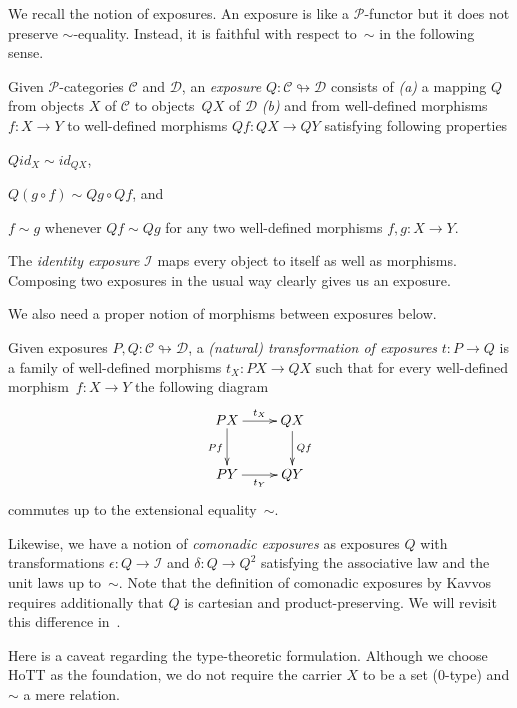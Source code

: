 \documentclass[a4paper,UKenglish,numberwithinsect,cleveref,thm-restate]{lipics-v2021}
\numberwithin{equation}{section}
\newcommand{\PP}{\mathscr{P}}
\newcommand{\iid}{\mathit{id}}
\theoremstyle{plain}
\begin{document}
We recall the notion of exposures.
An exposure is like a $\PP$-functor but it does not preserve $\sim$-equality.
Instead, it is faithful with respect to~$\sim$ in the following sense.
\begin{definition}
  Given $\PP$-categories $\mathscr{C}$ and $\mathscr{D}$, an \emph{exposure} $Q\colon \mathscr{C} \looparrowright \mathscr{D}$ consists of \emph{(a)} a mapping $Q$ from objects $X$ of $\mathscr{C}$ to objects~$QX$ of $\mathscr{D}$ \emph{(b)} and from well-defined morphisms $f\colon X \to Y$ to well-defined morphisms $Qf\colon QX \to QY$ satisfying following properties
  \begin{romanenumerate}
    \item $Q\iid_X \sim \iid_{QX}$,
    \item $Q(g \circ f) \sim Qg \circ Qf$, and
    \item $f \sim g$ whenever $Qf \sim Qg$ for any two well-defined morphisms $f, g\colon X \to Y$. 
  \end{romanenumerate}
\end{definition}


The \emph{identity exposure} $\mathcal{I}$ maps every object to itself as well as morphisms.
Composing two exposures in the usual way clearly gives us an exposure. 

We also need a proper notion of morphisms between exposures below.
\begin{definition}
  Given exposures $P, Q\colon \mathscr{C} \looparrowright \mathscr{D}$, a \emph{(natural) transformation of exposures} $t\colon P \to Q$ is a family of well-defined morphisms $t_X \colon PX \to QX$ such that for every well-defined morphism~$f\colon X \to Y$ the following diagram
  \[
    \xymatrix{
      PX \ar[d]_{Pf} \ar[r]^{t_X} & QX \ar[d]^{Qf} \\
      PY \ar[r]_{t_Y} & QY
    }
  \]
  commutes up to the extensional equality~$\sim$.
\end{definition}
Likewise, we have a notion of \emph{comonadic exposures} as exposures $Q$ with transformations $\epsilon\colon Q \to \mathcal{I}$ and $\delta\colon Q \to Q^2$ satisfying the associative law and the unit laws up to~$\sim$.
Note that the definition of comonadic exposures by Kavvos~\cite{Kavvos2017b} requires additionally that $Q$ is cartesian and product-preserving.
We will revisit this difference in~.

Here is a caveat regarding the type-theoretic formulation.
Although we choose HoTT as the foundation, we do not require the carrier $X$ to be a set ($0$-type) and $\sim$ a mere relation. 
\end{document}
